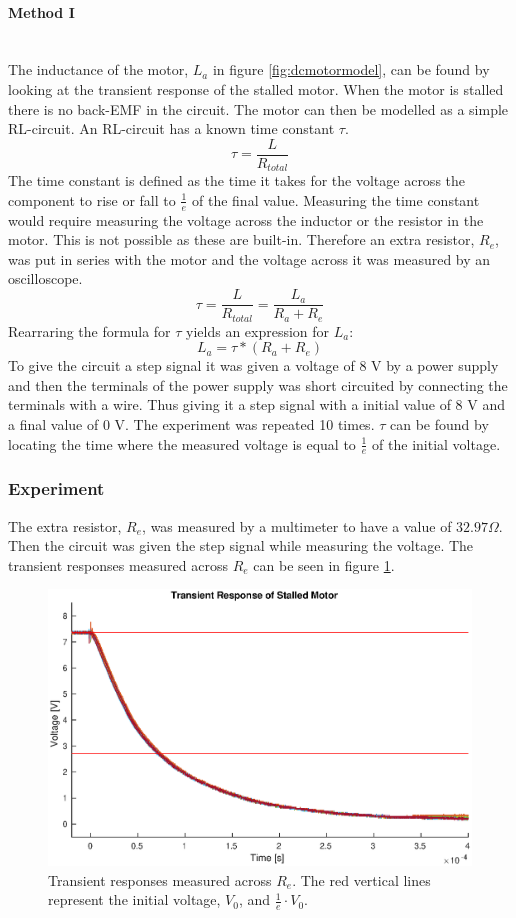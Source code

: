 \paragraph{Method I}~\\
The inductance of the motor, $L_a$ in figure \ref{fig:dcmotormodel}, can be found by looking at the transient response of the stalled motor. 
When the motor is stalled there is no back-EMF in the circuit. The motor can then be modelled as a simple RL-circuit. 
An RL-circuit has a known time constant $\tau$.
$$\tau = \frac{L}{R_{total}}$$
The time constant is defined as the time it takes for the voltage across the component to rise or fall to $\frac{1}{e}$ of the final value.
Measuring the time constant would require measuring the voltage across the inductor or the resistor in the motor. This is not possible as these are built-in. 
Therefore an extra resistor, $R_e$, was put in series with the motor and the voltage across it was measured by an oscilloscope. 
$$\tau = \frac{L}{R_{total}} = \frac{L_a}{R_a+R_e}$$
Rearraring the formula for $\tau$ yields an expression for $L_a$: 
$$L_a = \tau * (R_a + R_e)$$
To give the circuit a step signal it was given a voltage of 8 V by a power supply and then the terminals of the power supply was  short circuited by connecting the terminals with a wire. Thus giving it a step signal with a initial value of 8 V and a final value of 0 V.
The experiment was repeated 10 times. $\tau$ can be found by locating the time where the measured voltage is equal to $\frac{1}{e}$ of the initial voltage.

\subsubsection{Experiment}
The extra resistor, $R_e$, was measured by a multimeter to have a value of $32.97\Omega$.
Then the circuit was given the step signal while measuring the voltage.
The transient responses measured across $R_e$ can be seen in figure \ref{fig:trans_plot}.

\begin{figure}[!h]
	\centering
	\includegraphics[width=.75\linewidth]{graphics/transient_32ohm}
	\caption{Transient responses measured across $R_e$. The red vertical lines represent the initial voltage, $V_0$, and $\frac{1}{e} \cdot V_0$.}
	\label{fig:trans_plot}
\end{figure}


